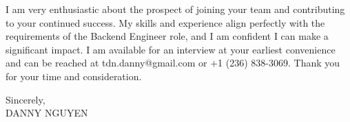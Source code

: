 \documentclass[letterpaper,11pt]{article}
\begin{document}
I am very enthusiastic about the prospect of joining your team and contributing to your continued success. My skills and experience align perfectly with the requirements of the Backend Engineer role, and I am confident I can make a significant impact. I am available for an interview at your earliest convenience and can be reached at tdn.danny@gmail.com or +1 (236) 838-3069. Thank you for your time and consideration.
\vspace{20pt}

Sincerely, \\
\vspace{40pt} %
DANNY NGUYEN

\end{document}
